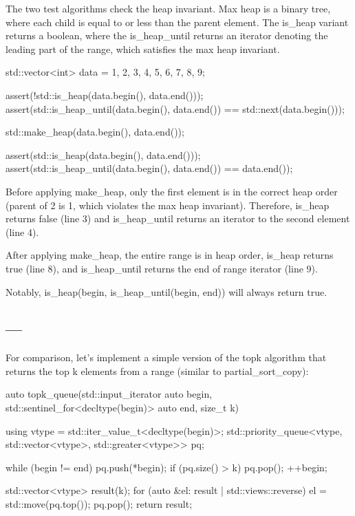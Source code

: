 The two test algorithms check the heap invariant. Max heap is a binary tree, where each child is equal to or less than the parent element. The is\_heap variant returns a boolean, where the is\_heap\_until returns an iterator denoting the leading part of the range, which satisfies the max heap invariant.

\begin{box-note}
\begin{cppcode}
std::vector<int> data = {1, 2, 3, 4, 5, 6, 7, 8, 9};

assert(!std::is_heap(data.begin(), data.end()));
assert(std::is_heap_until(data.begin(), data.end()) == std::next(data.begin()));

std::make_heap(data.begin(), data.end());

assert(std::is_heap(data.begin(), data.end()));
assert(std::is_heap_until(data.begin(), data.end()) == data.end());
\end{cppcode}
\end{box-note}

Before applying make\_heap, only the first element is in the correct heap order (parent of 2 is 1, which violates the max heap invariant). Therefore, is\_heap returns false (line 3) and is\_heap\_until returns an iterator to the second element (line 4).

After applying make\_heap, the entire range is in heap order, is\_heap returns true (line 8), and is\_heap\_until returns the end of range iterator (line 9).

Notably, is\_heap(begin, is\_heap\_until(begin, end)) will always return true.

\subsection{---}


For comparison, let’s implement a simple version of the topk algorithm that returns the top k elements from a range (similar to partial\_sort\_copy):

\begin{box-note}
\begin{cppcode}
auto topk_queue(std::input_iterator auto begin, std::sentinel_for<decltype(begin)> auto end, 
                size_t k) {

    using vtype = std::iter_value_t<decltype(begin)>;
    std::priority_queue<vtype, std::vector<vtype>, std::greater<vtype>> pq;

    while (begin != end) {
        pq.push(*begin);
        if (pq.size() > k)
            pq.pop();
        ++begin;
    }

    std::vector<vtype> result(k);
    for (auto &el: result | std::views::reverse) {
        el = std::move(pq.top());
        pq.pop();
    }
    return result;    
}
\end{cppcode}
\end{box-note}

